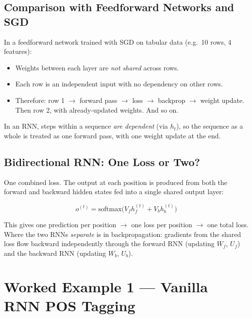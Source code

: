 \subsection{Comparison with Feedforward Networks and SGD}

In a feedforward network trained with SGD on tabular data (e.g.\ 10 rows, 4 features):

\begin{itemize}
    \item Weights between each layer are \emph{not shared} across rows.
    \item Each row is an independent input with no dependency on other rows.
    \item Therefore: row 1 $\to$ forward pass $\to$ loss $\to$ backprop $\to$ weight
          update. Then row 2, with already-updated weights. And so on.
\end{itemize}

In an RNN, steps within a sequence \emph{are dependent} (via $h_t$), so the
sequence as a whole is treated as one forward pass, with one weight update at the end.

\subsection{Bidirectional RNN: One Loss or Two?}

One combined loss. The output at each position is produced from both the forward and
backward hidden states fed into a single shared output layer:

\begin{equation}
    o^{(t)} = \text{softmax}\!\bigl(V_f h_f^{(t)} + V_b h_b^{(t)}\bigr)
\end{equation}

This gives one prediction per position $\to$ one loss per position $\to$ one total
loss. Where the two RNNs \emph{separate} is in backpropagation: gradients from the
shared loss flow backward independently through the forward RNN (updating $W_f$,
$U_f$) and the backward RNN (updating $W_b$, $U_b$).

\section{Worked Example 1 --- Vanilla RNN POS Tagging}

